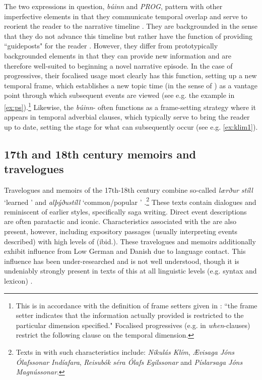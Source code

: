 \documentclass[output=paper,colorlinks,citecolor=brown]{langscibook}
\begin{document}
The two expressions in question, \textit{búinn} and \textit{PROG}, pattern with other imperfective elements in that they communicate temporal overlap and serve to reorient the reader to the narrative timeline \citep{Fludernik2012}. They are backgrounded in the sense that they do not advance this timeline but rather have the function of providing ``guideposts" for the reader \citep{chafe1984people}. However, they differ from prototypically backgrounded elements in that they can provide new information \citep{reinhart1984principles, Fleischman1985} and are therefore well-suited to beginning a novel narrative episode. In the case of progressives, their focalised usage most clearly has this function, setting up a new temporal frame, which establishes a new topic time (in the sense of \citeauthor{klein1994time} \citeyear{klein1994time}) as a vantage point through which subsequent events are viewed (see e.g. the example in \ref{ex:ps}).\footnote{This is in accordance with the definition of frame setters given in \citet[270]{krifka2008basic}:  ``the frame setter indicates that the information actually provided is restricted to the particular dimension specified." Focalised progressives (e.g. in \textit{when}-clauses) restrict the following clause on the temporal dimension.} Likewise, the \textit{búinn}-  often functions as a frame-setting strategy where it appears in temporal adverbial clauses, which typically serve to bring the reader up to date, setting the stage for what can subsequently occur (see e.g.  \ref{ex:klim1}).

\subsection{17th and 18th century memoirs and travelogues}\label{sec:Chark3.3}
Travelogues and memoirs of the 17th-18th century combine so-called \textit{lærður stíll} `learned ' and \textit{alþýðustíll} `common/popular ' \citep{hauksson1994islensk}.\footnote{Texts in  with such characteristics include: \textit{Nikulás Klím}, \textit{Ævisaga Jóns Ólafssonar Indíafara}, \textit{Reisubók séra Ólafs Egilssonar} and \textit{Píslarsaga Jóns Magnússonar}.} These texts contain dialogues and  reminiscent of earlier styles, specifically saga writing. Direct event descriptions are often paratactic and iconic. Characteristics associated with the  are also present, however, including expository passages (usually interpreting events described) with high levels of  (ibid.). These travelogues and memoirs additionally exhibit influence from Low German and Danish due to language contact. This influence has been under-researched and is not well understood, though it is undeniably strongly present in texts of this  at all linguistic levels (e.g. syntax and lexicon) \citep{ottosson1990islensk, hauksson1994islensk, sigmundsson1998}. 
\end{document}
